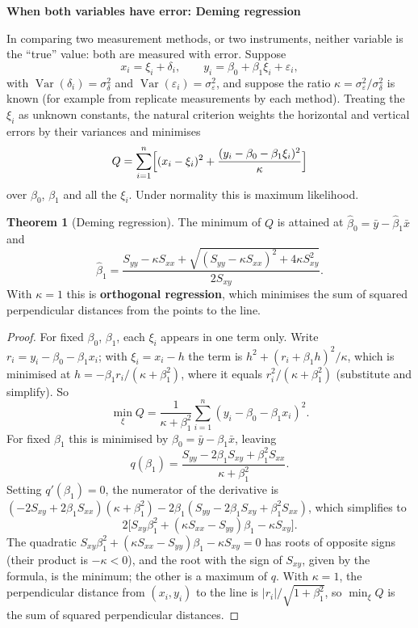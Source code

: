 \documentclass[11pt,a4paper]{article}
\numberwithin{equation}{section}
\theoremstyle{definition}
\newtheorem{thm}{Theorem}[subsection]
\newcommand{\subhead}[1]{%
  \par\medskip\noindent\textbf{#1}\par\nobreak\smallskip}
\begin{document}
\subhead{When both variables have error: Deming regression}
In comparing two measurement methods, or two instruments, neither variable is the ``true'' value: both are
measured with error. Suppose
\[
x_i = \xi_i + \delta_i , \qquad y_i = \beta_0 + \beta_1\xi_i + \varepsilon_i ,
\]
with $\operatorname{Var}(\delta_i) = \sigma_\delta^2$ and $\operatorname{Var}(\varepsilon_i) = \sigma_\varepsilon^2$, and suppose the ratio $\kappa = \sigma_\varepsilon^2/\sigma_\delta^2$ is known (for example from replicate
measurements by each method). Treating the $\xi_i$ as unknown constants, the natural criterion weights the
horizontal and vertical errors by their variances and minimises
\[
Q = \sum_{i=1}^n\Bigl[(x_i - \xi_i)^2 + \frac{(y_i - \beta_0 - \beta_1\xi_i)^2}{\kappa}\Bigr]
\]
over $\beta_0$, $\beta_1$ and all the $\xi_i$. Under normality this is maximum likelihood.

\begin{thm}[Deming regression]\label{thm:deming}
The minimum of $Q$ is attained at $\hat\beta_0 = \bar y - \hat\beta_1\bar x$ and
\[
\hat\beta_1 = \frac{S_{yy} - \kappa S_{xx} + \sqrt{(S_{yy} - \kappa S_{xx})^2 + 4\kappa S_{xy}^2}}{2S_{xy}} .
\]
With $\kappa = 1$ this is \textbf{orthogonal regression}, which minimises the sum of squared perpendicular distances
from the points to the line.
\end{thm}

\begin{proof}
For fixed $\beta_0$, $\beta_1$, each $\xi_i$ appears in one term only. Write $r_i = y_i - \beta_0 - \beta_1x_i$; with $\xi_i = x_i - h$ the term is
$h^2 + (r_i + \beta_1h)^2/\kappa$, which is minimised at $h = -\beta_1r_i/(\kappa + \beta_1^2)$, where it equals $r_i^2/(\kappa + \beta_1^2)$ (substitute and
simplify). So
\[
\min_{\xi}Q = \frac{1}{\kappa + \beta_1^2}\sum_{i=1}^n(y_i - \beta_0 - \beta_1x_i)^2 .
\]
For fixed $\beta_1$ this is minimised by $\beta_0 = \bar y - \beta_1\bar x$, leaving
\[
q(\beta_1) = \frac{S_{yy} - 2\beta_1S_{xy} + \beta_1^2S_{xx}}{\kappa + \beta_1^2} .
\]
Setting $q'(\beta_1) = 0$, the numerator of the derivative is
$(-2S_{xy} + 2\beta_1S_{xx})(\kappa + \beta_1^2) - 2\beta_1(S_{yy} - 2\beta_1S_{xy} + \beta_1^2S_{xx})$, which simplifies to
\[
2\bigl[S_{xy}\beta_1^2 + (\kappa S_{xx} - S_{yy})\beta_1 - \kappa S_{xy}\bigr] .
\]
The quadratic $S_{xy}\beta_1^2 + (\kappa S_{xx} - S_{yy})\beta_1 - \kappa S_{xy} = 0$ has roots of opposite signs (their product is $-\kappa < 0$), and the root with
the sign of $S_{xy}$, given by the formula, is the minimum; the other is a maximum of $q$. With $\kappa = 1$, the
perpendicular distance from $(x_i, y_i)$ to the line is $|r_i|/\sqrt{1 + \beta_1^2}$, so $\min_{\xi}Q$ is the sum of squared perpendicular
distances.
\end{proof}
\end{document}
